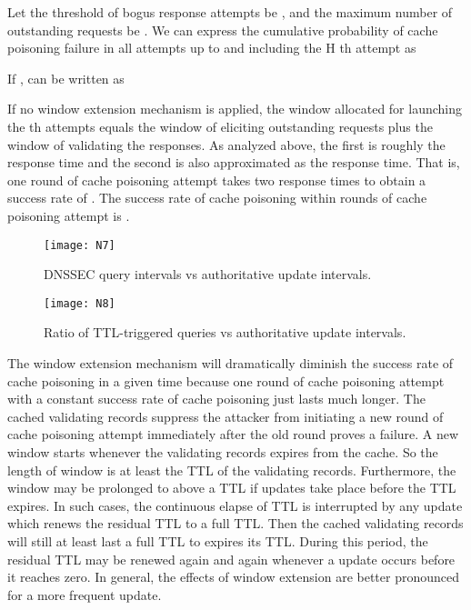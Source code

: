 \documentclass[conference]{IEEEtran}
\begin{document}
Let the threshold of bogus response attempts be , and the maximum number of outstanding requests be . We can express the cumulative probability of cache poisoning failure in all attempts up to and including the H th attempt as

If ,  can be written as

If no window extension mechanism is applied, the window allocated for launching the  th attempts equals the window of eliciting outstanding requests plus the window of validating the responses. As analyzed above, the first is roughly the response time and the second is also approximated as the response time. That is, one round of cache poisoning attempt takes two response times to obtain a success rate of . The success rate of cache poisoning within  rounds of cache poisoning attempt is .

\begin{figure}[!t]\begin{minipage}[t]{0.48\linewidth}
\centering
\texttt{[image: N7]}
\vspace{-1em}
\caption{DNSSEC query intervals vs authoritative update intervals.}
\vspace{-2em}
\end{minipage}
\hspace{0.3cm}
\begin{minipage}[t]{0.48\linewidth}
\centering
\texttt{[image: N8]}
\caption{Ratio of TTL-triggered queries vs authoritative update intervals.}
\vspace{-2em}
\end{minipage}
\end{figure}

The window extension mechanism will dramatically diminish the success rate of cache poisoning in a given time because one round of cache poisoning attempt with a constant success rate of cache poisoning just lasts much longer. The cached validating records suppress the attacker from initiating a new round of cache poisoning attempt immediately after the old round proves a failure. A new window starts whenever the validating records expires from the cache. So the length of window is at least the TTL of the validating records. Furthermore, the window may be prolonged to above a TTL if updates take place before the TTL expires. In such cases, the continuous elapse of TTL is interrupted by any update which renews the residual TTL to a full TTL. Then the cached validating records will still at least last a full TTL to expires its TTL. During this period, the residual TTL may be renewed again and again whenever a update occurs before it reaches zero. In general, the effects of window extension are better pronounced for a more frequent update.
\end{document}
